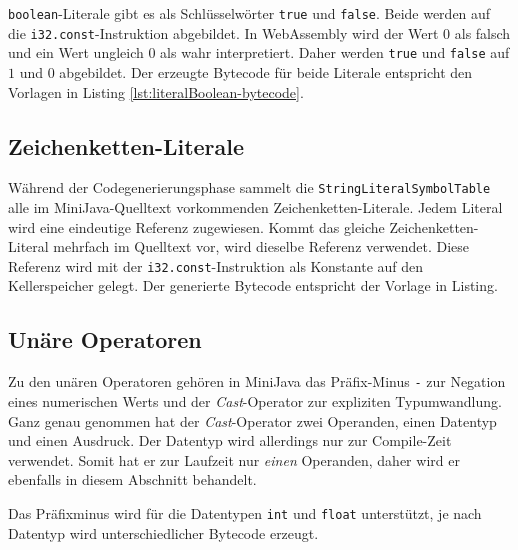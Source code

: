 

\lstinline{boolean}-Literale gibt es als Schlüsselwörter \lstinline{true} und \lstinline{false}. Beide werden auf die \lstinline{i32.const}-Instruktion abgebildet. In WebAssembly wird der Wert $0$ als falsch und ein Wert ungleich $0$ als wahr interpretiert. Daher werden \lstinline{true} und \lstinline{false} auf $1$ und $0$ abgebildet. Der erzeugte Bytecode für beide Literale entspricht den Vorlagen in Listing \ref{lst:literalBoolean-bytecode}.



\subsection{Zeichenketten-Literale}
\label{subsec:Zeichenketten-Literale}

Während der Codegenerierungsphase sammelt die \lstinline{StringLiteralSymbolTable} alle im MiniJava-Quelltext vorkommenden Zeichenketten-Literale. Jedem Literal wird eine eindeutige Referenz zugewiesen. Kommt das gleiche Zeichenketten-Literal mehrfach im Quelltext vor, wird dieselbe Referenz verwendet. Diese Referenz wird mit der \lstinline{i32.const}-Instruktion als Konstante auf den Kellerspeicher gelegt. Der generierte Bytecode entspricht der Vorlage in Listing.



\subsection{Unäre Operatoren}
Zu den unären Operatoren gehören in MiniJava das Präfix-Minus \lstinline{-} zur Negation eines numerischen Werts und der \emph{Cast}-Operator zur expliziten Typumwandlung. Ganz genau genommen hat der \emph{Cast}-Operator zwei Operanden, einen Datentyp und einen Ausdruck. Der Datentyp wird allerdings nur zur Compile-Zeit verwendet. Somit hat er zur Laufzeit nur \emph{einen} Operanden, daher wird er ebenfalls in diesem Abschnitt behandelt.

Das Präfixminus wird für die Datentypen \lstinline{int} und \lstinline{float} unterstützt, je nach Datentyp wird unterschiedlicher Bytecode erzeugt.

